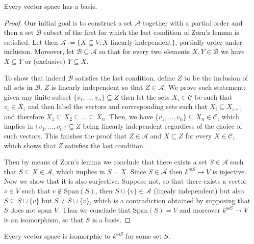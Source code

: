 \begin{theorem}
  Every vector space has a basis.
\end{theorem}

\begin{proof}
  Our initial goal is to construct a set \(\mathcal A\) together with a partial
  order and then a set \(\mathcal B\) subset of the first for which the last
  condition of Zorn's lemma is satisfied. Let then \(\mathcal A := \{X \subseteq
  V : X \text{ linearly independent}\}\), partially order under inclusion.
  Moreover, let \(\mathcal B \subseteq \mathcal A\) so that for every two
  elements \(X, Y \in \mathcal B\) we have \(X \subseteq Y\) or (exclusive) \(Y
  \subseteq X\).

  To show that indeed \(\mathcal B\) satisfies the last condition, define \(Z\)
  to be the inclusion of all sets in \(\mathcal B\). \(Z\) is linearly
  independent so that \(Z \in \mathcal A\). We prove such statement: given any
  finite subset \(\{v_1, \dots, v_n\} \subseteq Z\) then let the sets \(X_i \in
  \mathcal C\) be such that \(v_i \in X_i\) and then label the vectors and
  corresponding sets such that \(X_i \subseteq X_{i+1}\) and therefore \(X_1
  \subseteq  X_2 \subseteq  \dots \subseteq X_n\). Then, we have \(\{v_1, \dots,
  v_n\} \subseteq X_n \in \mathcal C\), which implies in \(\{v_1, \dots, v_n\}
  \subseteq Z\) being linearly independent regardless of the choice of such
  vectors. This finishes the proof that \(Z \in \mathcal A\) and \(X \subseteq
  Z\) for every \(X \in \mathcal C\), which shows that \(Z\) satisfies the last
  condition.

  Then by means of Zorn's lemma we conclude that there exists a set \(S \in
  \mathcal A\) such that \(S \subseteq X \in \mathcal A\), which implies in \(S
  = X\).  Since \(S \in \mathcal A\) then \(k^{\oplus S} \to V\) is injective.
  Now we show that it is also surjective. Suppose not, so that there exists a
  vector \(v \in V\) such that \(v \not\in \mathrm{Span}(S)\), then \(S \cup
  \{v\} \in \mathcal A\) (linealy independent) but also \(S \subseteq S \cup
  \{v\}\) but \(S \neq S \cup \{v\}\), which is a contradiction obtained by
  supposing that \(S\) does not span \(V\). Thus we conclude that
  \(\mathrm{Span}(S) = V\) and moreover \(k^{\oplus S} \to V\) is an
  isomorphism, so that \(S\) is a basis.
\end{proof}

\begin{corollary}
  Every vector space is isomorphic to \(k^{\oplus S}\) for some set \(S\).
\end{corollary}

